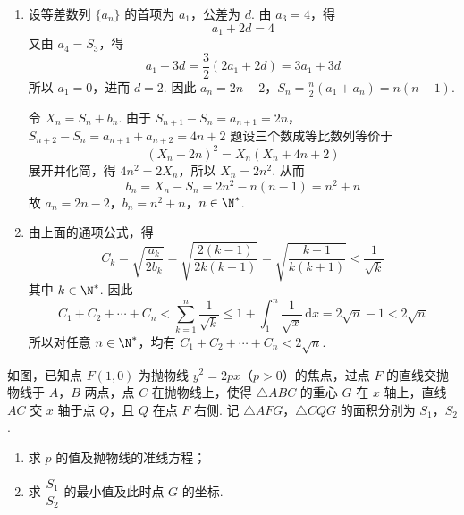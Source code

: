 \begin{solution}
\begin{enumerate}
\item 设等差数列 \(\{a_n\}\) 的首项为 \(a_1\)，公差为 \(d\). 由 \(a_3=4\)，得
\[
a_1+2d=4
\]
又由 \(a_4=S_3\)，得
\[
a_1+3d=\frac32\left(2a_1+2d\right)=3a_1+3d
\]
所以 \(a_1=0\)，进而 \(d=2\). 因此
\(a_n=2n-2\)，\(S_n=\frac n2\left(a_1+a_n\right)=n(n-1)\).

令 \(X_n=S_n+b_n\). 由于
\(S_{n+1}-S_n=a_{n+1}=2n\)，\(S_{n+2}-S_n=a_{n+1}+a_{n+2}=4n+2\)
题设三个数成等比数列等价于
\[
(X_n+2n)^2=X_n(X_n+4n+2)
\]
展开并化简，得 \(4n^2=2X_n\)，所以 \(X_n=2n^2\). 从而
\[
b_n=X_n-S_n=2n^2-n(n-1)=n^2+n
\]
故 \(a_n=2n-2\)，\(b_n=n^2+n\)，\(n\in\N^*\).

\item 由上面的通项公式，得
\[
C_k=\sqrt{\frac{a_k}{2b_k}}=\sqrt{\frac{2(k-1)}{2k(k+1)}}=\sqrt{\frac{k-1}{k(k+1)}}<\frac1{\sqrt{k}}
\]
其中 \(k\in\N^*\). 因此
\[
C_1+C_2+\cdots+C_n<\sum_{k=1}^n\frac1{\sqrt{k}}\le1+\int_1^n\frac{1}{\sqrt{x}}\,\mathrm dx=2\sqrt n-1<2\sqrt n
\]
所以对任意 \(n\in\N^*\)，均有 \(C_1+C_2+\cdots+C_n<2\sqrt n\).
\end{enumerate}
\end{solution}

\begin{problem}
如图，已知点 \(F(1,0)\) 为抛物线 \(y^2=2px\)（\(p>0\)）的焦点，过点 \(F\) 的直线交抛物线于 \(A\)，\(B\) 两点，点 \(C\) 在抛物线上，使得 \(\triangle ABC\) 的重心 \(G\) 在 \(x\) 轴上，直线 \(AC\) 交 \(x\) 轴于点 \(Q\)，且 \(Q\) 在点 \(F\) 右侧. 记 \(\triangle AFG\)，\(\triangle CQG\) 的面积分别为 \(S_1\)，\(S_2\).

\begin{enumerate}
  \item 求 \(p\) 的值及抛物线的准线方程；
  \item 求 \(\dfrac{S_1}{S_2}\) 的最小值及此时点 \(G\) 的坐标.
\end{enumerate}

\end{problem}

